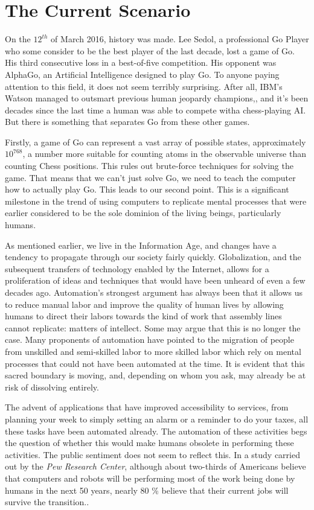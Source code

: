 \section{The Current Scenario}
\label{sec:-current}
On the $12^{th}$ of March 2016, history was made. Lee Sedol, a 
professional Go Player who some consider to be the best player of the 
last decade, lost a game of Go. His third consecutive loss in a 
best-of-five competition. His opponent was AlphaGo, an Artificial 
Intelligence designed to play Go\cite{alphagolee}.  To anyone paying 
attention to this field, it does not seem terribly surprising.  After 
all, IBM's Watson managed to outsmart previous human jeopardy 
champions,\cite{watsonjeopardy}, and it's been decades since the last 
time a human was able to compete witha chess-playing AI. But there is 
something that separates Go from these other games. 

Firstly, a game of Go can represent a vast array of possible states, 
approximately $10^{768}$, a number more suitable for counting atoms 
in the observable universe than counting Chess positions.  This rules 
out brute-force techniques for solving the game.  That means that we 
can't just solve Go, we need to teach the computer how to actually play 
Go.  This leads to our second point. This is a significant 
milestone in the trend of using computers to replicate mental 
processes that were earlier considered to be the sole dominion of the 
living beings, particularly humans.

As mentioned earlier, we live in the Information Age, and changes have a 
tendency to propagate through our society fairly quickly. Globalization, 
and the subsequent transfers of technology enabled by the Internet, 
allows for a proliferation of ideas and techniques that would have been 
unheard of even a few decades ago. Automation's strongest argument has 
always been that it allows us to reduce manual labor and improve the 
quality of human lives by allowing humans to direct their labors towards
the kind of work that assembly lines cannot replicate: matters of 
intellect.  Some may argue that this is no longer the case.  
Many proponents of automation have pointed to the migration of people 
from unskilled and semi-skilled labor to more skilled labor which 
rely on mental processes that could not have been automated at the 
time. It is evident that this sacred boundary is moving, and, 
depending on whom you ask, may already be at risk of dissolving 
entirely.

The advent of applications that have improved accessibility to services, 
from planning your week to simply setting an alarm or a reminder to do 
your taxes, all these tasks have been automated already. The automation 
of these activities begs the question of whether this would make humans 
obsolete in performing these activities. The public sentiment does not 
seem to reflect this. In a study carried out by the 
\textit{Pew Research Center}\cite{workforcepew}, although about 
two-thirds of Americans believe that computers and robots will be 
performing most of the work being done by humans in the next 50 
years, nearly 80 \% believe that their current jobs will survive the 
transition..
	

